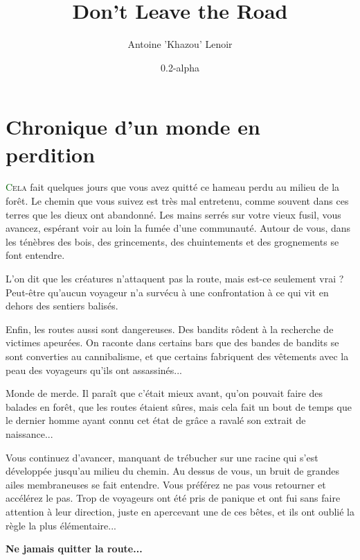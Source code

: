 \documentclass[twoside,12pt,english]{book}
\title{Don't Leave the Road}
\author{Antoine 'Khazou' Lenoir}
\date{0.2-alpha}
\newcommand*\initfamily{\usefont{U}{Acorn}{xl}{n}}
\begin{document}

\maketitle

\section*{Chronique d'un monde en perdition}

\lettrine[lines=3]{\initfamily\textcolor{darkgreen}{C}}{ela} fait quelques jours que vous avez quitté ce hameau perdu au milieu de la forêt. Le chemin que vous suivez est très mal entretenu, comme souvent dans ces terres que les dieux ont abandonné. Les mains serrés sur votre vieux fusil, vous avancez, espérant voir au loin la fumée d'une communauté. Autour de vous, dans les ténèbres des bois, des grincements, des chuintements et des grognements se font entendre.

L'on dit que les créatures n'attaquent pas la route, mais est-ce seulement vrai ? Peut-être qu'aucun voyageur n'a survécu à une confrontation à ce qui vit en dehors des sentiers balisés.

Enfin, les routes aussi sont dangereuses. Des bandits rôdent à la recherche de victimes apeurées. On raconte dans certains bars que des bandes de bandits se sont converties au cannibalisme, et que certains fabriquent des vêtements avec la peau des voyageurs qu'ils ont assassinés...

Monde de merde. Il paraît que c'était mieux avant, qu'on pouvait faire des balades en forêt, que les routes étaient sûres, mais cela fait un bout de temps que le dernier homme ayant connu cet état de grâce a ravalé son extrait de naissance...

Vous continuez d'avancer, manquant de trébucher sur une racine qui s'est développée jusqu'au milieu du chemin. Au dessus de vous, un bruit de grandes ailes membraneuses se fait entendre. Vous préférez ne pas vous retourner et accélérez le pas. Trop de voyageurs ont été pris de panique et ont fui sans faire attention à leur direction, juste en apercevant une de ces bêtes, et ils ont oublié la règle la plus élémentaire...

\textbf{Ne jamais quitter la route...}

\tableofcontents






\end{document}
